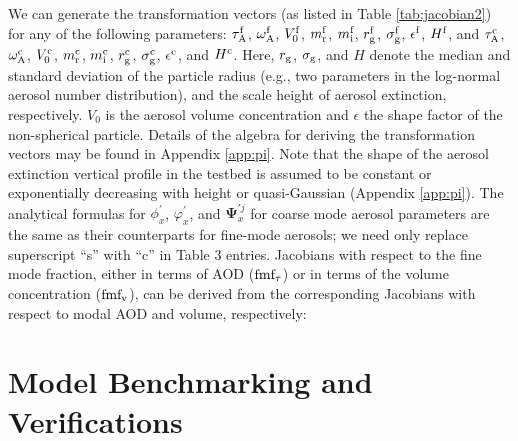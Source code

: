 We can generate the transformation vectors (as listed in Table
\ref{tab:jacobian2}) for any of the following parameters: $\tau_\text{A}^\text{f}$, 
$\omega_\text{A}^\text{f}$, $V_0^\text{f}$, $m_\text{r}^\text{f}$, $m_\text{i}^\text{f}$, $r_\text{g}^\text{f}$,
$\sigma_\text{g}^\text{f}$, $\epsilon^\text{f}$, $H^\text{f}$, and $\tau_\text{A}^\text{c}$,
$\omega_\text{A}^\text{c}$, $V_0^\text{c}$, $m_\text{r}^\text{c}$, $m_\text{i}^\text{c}$,
$r_\text{g}^\text{c}$, $\sigma_\text{g}^\text{c}$, $\epsilon^\text{c}$, and $H^\text{c}$. Here,
$r_\text{g}$, $\sigma_\text{g}$, and $H$ denote the median and standard deviation of the
particle radius (e.g., two parameters in the log-normal aerosol number
distribution), and the scale height of aerosol extinction, respectively.
$V_0$ is the aerosol volume concentration and $\epsilon$ the shape 
factor of the non-spherical particle. Details of the algebra for deriving 
the transformation vectors may be found in Appendix \ref{app:pi}. 
Note that the shape of the aerosol extinction vertical profile in the
testbed is assumed to be constant or exponentially decreasing with
height or quasi-Gaussian (Appendix \ref{app:pi}). The analytical
formulas for $\phi_x^\prime$, $\varphi_x^\prime$, and
$\pmb{\Psi}_x^{\prime j}$ for coarse mode aerosol parameters are
the same as their counterparts for fine-mode aerosols; we need only
replace superscript “s” with “c” in Table 3 entries. Jacobians with
respect to the fine mode fraction, either in terms of AOD
($\text{fmf}_\tau$) or in terms of the volume concentration ($\text{fmf}_\text{v}$), 
can be derived from the corresponding Jacobians with respect to 
modal AOD and volume, respectively:


\section{Model Benchmarking and Verifications} \label{sec:rtmverify}

